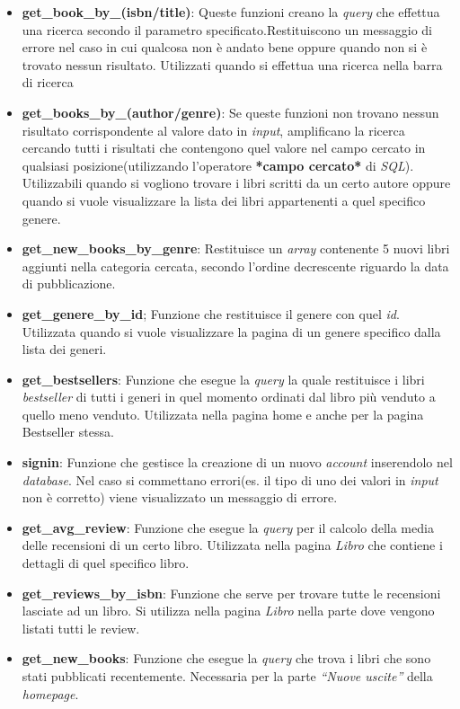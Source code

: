 \begin{itemize}
	\item \textbf{get\_book\_by\_(isbn/title)}: Queste funzioni creano la \textit{query} che effettua una ricerca secondo il parametro specificato.Restituiscono un messaggio di errore nel caso in cui qualcosa non è andato bene oppure quando non si è trovato nessun risultato. Utilizzati quando si effettua una ricerca nella barra di ricerca
	\item \textbf{get\_books\_by\_(author/genre)}: Se queste funzioni non trovano nessun risultato corrispondente al valore dato in \textit{input}, amplificano la ricerca cercando tutti i risultati che contengono quel valore nel campo cercato in qualsiasi posizione(utilizzando l’operatore \textbf{*campo cercato*} di \textit{SQL}). Utilizzabili quando si vogliono trovare i libri scritti da un certo autore oppure quando si vuole visualizzare la lista dei libri appartenenti a quel specifico genere.
	\item \textbf{get\_new\_books\_by\_genre}: Restituisce un \textit{array} contenente 5 nuovi libri aggiunti nella categoria cercata, secondo l’ordine decrescente riguardo la data di pubblicazione.
	\item \textbf{get\_genere\_by\_id}; Funzione che restituisce il genere con quel \textit{id}. Utilizzata quando si vuole visualizzare la pagina di un genere specifico dalla lista dei generi.
	\item \textbf{get\_bestsellers}: Funzione che esegue la \textit{query} la quale restituisce i libri \textit{bestseller} di tutti i generi in quel momento ordinati dal libro più venduto a quello meno venduto. Utilizzata nella pagina home e anche per la pagina Bestseller stessa.
	\item \textbf{signin}: Funzione che gestisce la creazione di un nuovo \textit{account} inserendolo nel \textit{database}. Nel caso si commettano errori(es. il tipo di uno dei valori in \textit{input} non è corretto) viene visualizzato un messaggio di errore.
	\item \textbf{get\_avg\_review}: Funzione che esegue la \textit{query} per il calcolo della media delle recensioni di un certo libro. Utilizzata nella pagina \textit{Libro} che contiene i dettagli di quel specifico libro.
	\item \textbf{get\_reviews\_by\_isbn}: Funzione che serve per trovare tutte le recensioni lasciate ad un libro. Si utilizza nella pagina \textit{Libro} nella parte dove vengono listati tutti le review.
	\item \textbf{get\_new\_books}: Funzione che esegue la \textit{query} che trova i libri che sono stati pubblicati recentemente. Necessaria per la parte \textit{“Nuove uscite”} della \textit{homepage}.

\end{itemize}
